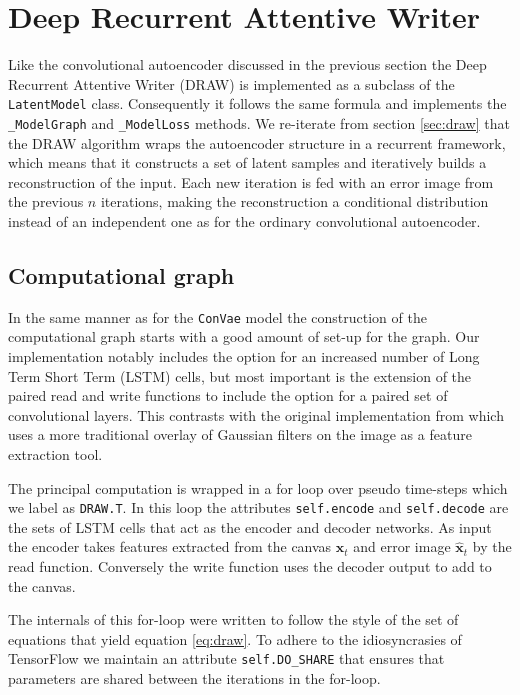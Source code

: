 
\section{Deep Recurrent Attentive Writer}\label{sec:draw_implement}

Like the convolutional autoencoder discussed in the previous section the Deep Recurrent Attentive Writer (DRAW) is implemented as a subclass of the \lstinline{LatentModel} class. Consequently it follows the same formula and implements the  \lstinline{_ModelGraph} and \lstinline{_ModelLoss} methods. We re-iterate from section \ref{sec:draw} that the  DRAW algorithm wraps the autoencoder structure in a recurrent framework, which means that it constructs a set of latent samples and iteratively builds a reconstruction of the input. Each new iteration is fed with an error image from the previous $n$ iterations, making the reconstruction a conditional distribution instead of an independent one as for the ordinary convolutional autoencoder. 

\subsection{Computational graph}

In the same manner as for the \lstinline{ConVae} model the construction of the computational graph starts with a good amount of set-up for the graph. Our implementation notably includes the option for an increased number of  Long Term Short Term (LSTM) cells, but most important is the extension of the paired read and write functions to include the option for a paired set of convolutional layers. This contrasts with the original implementation from \citet{Gregor2015} which uses a more traditional overlay of Gaussian filters on the image as a feature extraction tool. 


The principal computation is wrapped in a for loop over pseudo time-steps which we label as \lstinline{DRAW.T}. In this loop the attributes \lstinline{self.encode} and \lstinline{self.decode} are the sets of LSTM cells that act as the encoder and decoder networks. As input the encoder takes features extracted from the canvas $\mathbf{x}_t$ and error image $\mathbf{\hat{x}}_t$ by the read function. Conversely the write function uses the decoder output to add to the canvas. 

The internals of this for-loop were written to follow the style of the set of equations that yield equation \ref{eq:draw}. To adhere to the idiosyncrasies of TensorFlow we maintain an attribute \lstinline{self.DO_SHARE} that ensures that parameters are shared between the iterations in the for-loop.

